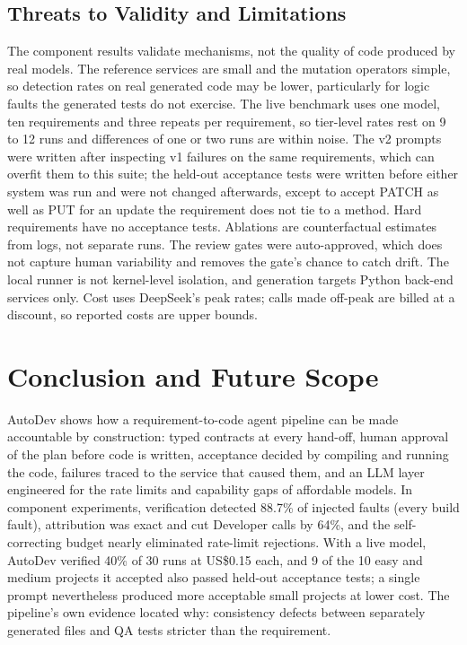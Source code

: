 \documentclass[conference,letterpaper]{IEEEtran}
\begin{document}
\subsection{Threats to Validity and Limitations}
The component results validate mechanisms, not the quality of code produced by
real models. The reference services are small and the mutation operators simple,
so detection rates on real generated code may be lower, particularly for logic
faults the generated tests do not exercise. The live benchmark uses one model,
ten requirements and three repeats per requirement, so tier-level rates rest on
9 to 12 runs and differences of one or two runs are within noise. The v2 prompts
were written after inspecting v1 failures on the same requirements, which can
overfit them to this suite; the held-out acceptance tests were written before
either system was run and were not changed afterwards, except to accept PATCH as
well as PUT for an update the requirement does not tie to a method. Hard
requirements have no acceptance tests. Ablations are counterfactual estimates
from logs, not separate runs. The review gates were auto-approved, which does not
capture human variability and removes the gate's chance to catch drift. The local
runner is not kernel-level isolation, and generation targets Python back-end
services only. Cost uses DeepSeek's peak rates; calls made off-peak are billed at a discount,
so reported costs are upper bounds.

\section{Conclusion and Future Scope}
AutoDev shows how a requirement-to-code agent pipeline can be made accountable by
construction: typed contracts at every hand-off, human approval of the plan before
code is written, acceptance decided by compiling and running the code, failures
traced to the service that caused them, and an LLM layer engineered for the rate
limits and capability gaps of affordable models. In component experiments,
verification detected 88.7\% of injected faults (every build fault), attribution
was exact and cut Developer calls by 64\%, and the self-correcting budget nearly
eliminated rate-limit rejections. With a live model, AutoDev verified 40\% of
30 runs at US\$0.15 each, and 9 of the 10 easy and medium projects it accepted
also passed held-out acceptance tests; a single prompt nevertheless
produced more acceptable small projects at lower cost. The pipeline's own
evidence located why: consistency defects between separately generated files
and QA tests stricter than the requirement.
\end{document}
